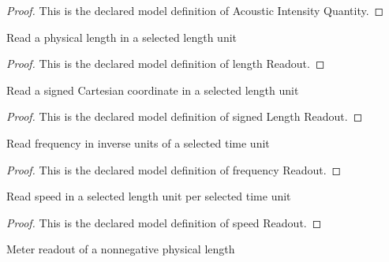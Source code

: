 \begin{proof}
  This is the declared model definition of Acoustic Intensity Quantity.
\end{proof}
\begin{definition}
  \label{def:physics:phyx-mini-0219:phyxminiproblems-problemphyxmini0219-lengthreadout}
  Read a physical length in a selected length unit
\end{definition}
\begin{proof}
  This is the declared model definition of length Readout.
\end{proof}
\begin{definition}
  \label{def:physics:phyx-mini-0219:phyxminiproblems-problemphyxmini0219-signedlengthreadout}
  Read a signed Cartesian coordinate in a selected length unit
\end{definition}
\begin{proof}
  This is the declared model definition of signed Length Readout.
\end{proof}
\begin{definition}
  \label{def:physics:phyx-mini-0219:phyxminiproblems-problemphyxmini0219-frequencyreadout}
  Read frequency in inverse units of a selected time unit
\end{definition}
\begin{proof}
  This is the declared model definition of frequency Readout.
\end{proof}
\begin{definition}
  \label{def:physics:phyx-mini-0219:phyxminiproblems-problemphyxmini0219-speedreadout}
  Read speed in a selected length unit per selected time unit
\end{definition}
\begin{proof}
  This is the declared model definition of speed Readout.
\end{proof}
\begin{definition}
  \label{def:physics:phyx-mini-0219:phyxminiproblems-problemphyxmini0219-lengthinmeters}
  Meter readout of a nonnegative physical length
\end{definition}
